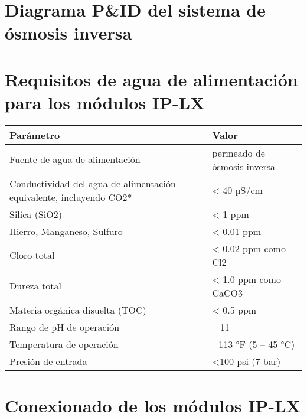 
\begin{appendixs}
    \fontsize{10}{12}\selectfont
    \vspace{-2cm} 
    \section{Diagrama P\&ID del sistema de ósmosis inversa}
    \section{Requisitos de agua de alimentación para los módulos IP-LX}
    \renewcommand{\arraystretch}{1} %
    \begin{longtable}{|>{\raggedright\arraybackslash}m{8cm} |>{\raggedright\arraybackslash}m{8cm}|}
        \toprule
        \textbf{Parámetro}                                                  & \textbf{Valor}              \\
        \midrule
        Fuente de agua de alimentación                                      & permeado de ósmosis inversa \\
        \hline
        Conductividad del agua de alimentación equivalente, incluyendo CO2* & < 40 µS/cm                  \\
        \hline
        Silica (SiO2)                                                       & < 1 ppm                     \\
        \hline
        Hierro, Manganeso, Sulfuro                                          & < 0.01 ppm                  \\
        \hline
        Cloro total                                                         & < 0.02 ppm como Cl2         \\
        \hline
        Dureza total                                                        & < 1.0 ppm como CaCO3        \\
        \hline
        Materia orgánica disuelta (TOC)                                     & < 0.5 ppm                   \\
        \hline
        Rango de pH de operación                                            & 4 – 11                      \\
        \hline
        Temperatura de operación                                            & 41 - 113 °F (5 – 45 °C)     \\
        \hline
        Presión de entrada                                                  & <100 psi (7 bar)            \\
        \bottomrule
    \end{longtable}
    \section{Conexionado de los módulos IP-LX}

\end{appendixs}